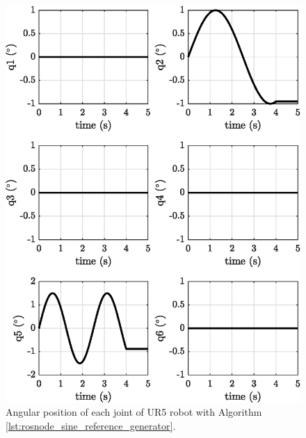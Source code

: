 \begin{figure}
    \centering
    \includegraphics{images/exp1.1/joint_position.eps}
    \caption{Angular position of each joint of UR5 robot with Algorithm \ref{lst:rosnode_sine_reference_generator}.}
    \label{fig:act1.1_joint_position}
\end{figure}

